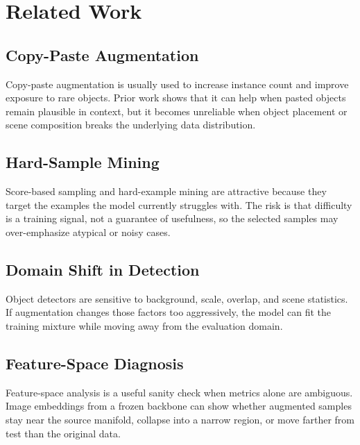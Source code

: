 \section{Related Work}

\subsection{Copy-Paste Augmentation}
Copy-paste augmentation is usually used to increase instance count and improve exposure to rare objects. Prior work shows that it can help when pasted objects remain plausible in context, but it becomes unreliable when object placement or scene composition breaks the underlying data distribution.

\subsection{Hard-Sample Mining}
Score-based sampling and hard-example mining are attractive because they target the examples the model currently struggles with. The risk is that difficulty is a training signal, not a guarantee of usefulness, so the selected samples may over-emphasize atypical or noisy cases.

\subsection{Domain Shift in Detection}
Object detectors are sensitive to background, scale, overlap, and scene statistics. If augmentation changes those factors too aggressively, the model can fit the training mixture while moving away from the evaluation domain.

\subsection{Feature-Space Diagnosis}
Feature-space analysis is a useful sanity check when metrics alone are ambiguous. Image embeddings from a frozen backbone can show whether augmented samples stay near the source manifold, collapse into a narrow region, or move farther from test than the original data.
